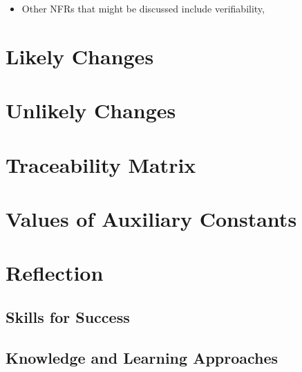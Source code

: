 \documentclass[12pt]{article}
\begin{document}
\begin{itemize}

 \item Other NFRs that might be discussed include verifiability,
\end{itemize}

\section{Likely Changes}
\section{Unlikely Changes}

\section{Traceability Matrix}

\appendix
\section{Values of Auxiliary Constants}

\newpage

\appendix
\section{Reflection}
\subsection{Skills for Success}
\subsection{Knowledge and Learning Approaches}
\end{document}
